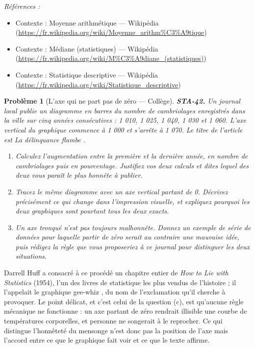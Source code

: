 \documentclass[11pt]{article}
\newtheorem{problem}{Problème}
\newenvironment{refs}{\par\small\noindent\emph{Références :}\begin{itemize}\setlength\itemsep{0pt}}{\end{itemize}\normalsize}
\begin{document}
\begin{refs}
\item Contexte : Moyenne arithmétique --- Wikipédia (\url{https://fr.wikipedia.org/wiki/Moyenne_arithm%C3%A9tique})
\item Contexte : Médiane (statistiques) --- Wikipédia (\url{https://fr.wikipedia.org/wiki/M%C3%A9diane_(statistiques)})
\item Contexte : Statistique descriptive --- Wikipédia (\url{https://fr.wikipedia.org/wiki/Statistique_descriptive})
\end{refs}

\bigskip

\begin{problem}[{L'axe qui ne part pas de zéro --- Collège}]
\textbf{STA-42.} Un journal local publie un diagramme en barres du nombre de cambriolages
enregistrés dans la ville sur cinq années consécutives : 1 010, 1 025, 1 040, 1 030 et 1 060.
L'axe vertical du graphique commence à 1 000 et s'arrête à 1 070. Le titre de l'article est \og{} La
délinquance flambe \fg{}.
\begin{enumerate}
\item[(a)] Calculez l'augmentation entre la première et la dernière année, en nombre de cambriolages puis
en pourcentage. Justifiez vos deux calculs et dites lequel des deux vous paraît le plus honnête à
publier.
\item[(b)] Tracez le même diagramme avec un axe vertical partant de 0. Décrivez précisément ce qui change
dans l'impression visuelle, et expliquez pourquoi les deux graphiques sont pourtant tous les deux
exacts.
\item[(c)] Un axe tronqué n'est pas toujours malhonnête. Donnez un exemple de série de données pour
laquelle partir de zéro serait au contraire une mauvaise idée, puis rédigez la règle que vous
proposeriez à ce journal pour distinguer les deux situations.
\end{enumerate}

\end{problem}

\noindent Darrell Huff a consacré à ce procédé un chapitre entier de \textit{How to Lie with
Statistics} (1954), l'un des livres de statistique les plus vendus de l'histoire ; il l'appelait
le graphique \og{} gee-whiz \fg{}, du nom de l'exclamation qu'il cherche à provoquer. Le point délicat, et
c'est celui de la question (c), est qu'aucune règle mécanique ne fonctionne : un axe partant de
zéro rendrait illisible une courbe de températures corporelles, et personne ne songerait à le
reprocher. Ce qui distingue l'honnêteté du mensonge n'est donc pas la position de l'axe mais
l'accord entre ce que le graphique fait voir et ce que le texte affirme.
\end{document}
